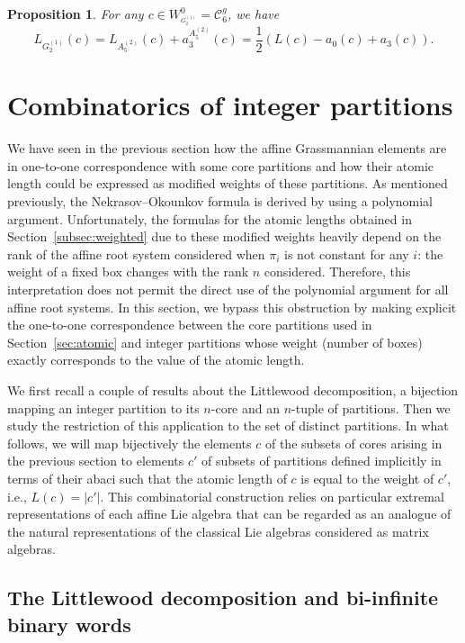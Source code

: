 \documentclass[10pt,a4paper]{amsart}
\newtheorem{Proposition}[Theorem]{Proposition}
 { \theoremstyle{definition}
\newtheorem{Definition}[Theorem]{Definition}
\newtheorem{Note}[Theorem]{Note}
\newtheorem{Example}[Theorem]{Example}
\newtheorem{Remark}[Theorem]{Remark} }
\numberwithin{equation}{section}
\begin{document}
\begin{Proposition}\label{Prop_G(2,1)}
	For any $c\in W_{^{G_{2}^{(1)}}}^{0}=\mathcal{C}_{6}^{g}$, we have
	\begin{equation*}
	L_{G_{2}^{(1)}}(c)=L_{A_{5}^{(2)}}(c)+a_{3}^{A_{5}^{(2)}}(c)=\frac{1}{2}
	(L(c)-a_{0}(c)+a_{3}(c)).
	\end{equation*}
\end{Proposition}

\section{Combinatorics of integer partitions}\label{sec:combi}


We have seen in the previous section how the affine Grassmannian elements are in one-to-one correspondence with some core partitions and how their atomic length could be expressed as modified weights of these partitions. As mentioned previously, the Nekrasov--Okounkov formula is derived by using a polynomial argument. Unfortunately, the formulas for the atomic lengths obtained in Section~\ref{subsec:weighted} due to these modified weights heavily depend on the rank of the affine root system considered when $\pi_i$ is not constant for any $i$: the weight of a fixed box changes with the rank $n$ considered. Therefore, this interpretation does not permit the direct use of the polynomial argument for all affine root systems. In this section, we bypass this obstruction by making explicit the one-to-one correspondence between the core partitions used in Section~\ref{sec:atomic} and integer partitions whose weight (number of boxes) exactly corresponds to the value of the atomic length.

We first recall a couple of results about the Littlewood decomposition, a bijection mapping an integer partition to its $n$-core and an $n$-tuple of partitions. Then we study the restriction of this application to the set of distinct partitions.
In what follows, we will map bijectively the elements $c$ of the subsets of cores arising in the previous section to elements $c'$ of subsets of partitions defined implicitly in terms of their abaci such that the atomic length of $c$ is equal to the weight of $c'$, i.e., $L(c)=\lvert c'\rvert$. This combinatorial construction relies on particular extremal representations of each affine Lie algebra that can be regarded as an analogue of the natural representations of the classical Lie algebras considered as matrix algebras.

\subsection{The Littlewood decomposition and bi-infinite binary words}
\end{document}

